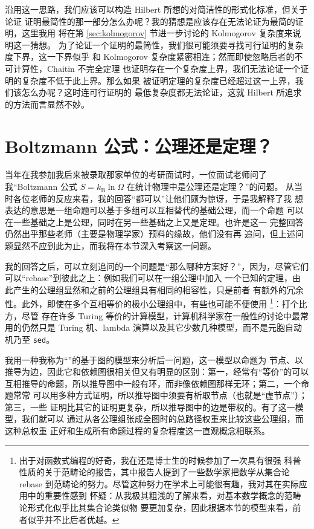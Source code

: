 沿用这一思路，我们应该可以构造 Hilbert 所想的对简洁性的形式化标准，但关于论证
证明最简性的那一部分怎么办呢？我的猜想是应该存在无法论证为最简的证明，这里我用
将在第 \ref{sec:kolmogorov} 节进一步讨论的 Kolmogorov 复杂度来说明这一猜想。
为了论证一个证明的最简性，我们很可能须要寻找可行证明的复杂度下界，这一下界似乎
和 Kolmogorov 复杂度紧密相连；然而即使忽略后者的不可计算性，Chaitin 不完全定理
也证明存在一个复杂度上界，我们无法论证一个证明的复杂度不低于此上界。那么如果
被证明定理的复杂度已经超过这一上界，我们该怎么办呢？这时连可行证明的
最低复杂度都无法论证，这就 Hilbert 所追求的方法而言显然不妙。

\section{Boltzmann 公式：公理还是定理？}\label{sec:boltzmann}

当年在我参加我后来被录取那家单位的考研面试时，一位面试老师问了我“Boltzmann
公式 $S = k_\mathrm{B} \ln\varOmega$ 在统计物理中是公理还是定理？”的问题。
从当时各位老师的反应来看，我的回答“都可以”让他们颇为惊讶，于是我解释了我
想表达的意思是一组命题可以基于多组可以互相替代的基础公理，而一个命题
可以在一些基础之上是公理，同时在另一些基础之上又是定理。也许是这一
完整回答仍然出乎那些老师（主要是物理学家）预料的缘故，他们没有再
追问，但上述问题显然不应到此为止，而我将在本节深入考察这一问题。

我的回答之后，可以立刻追问的一个问题是“那么哪种方案好？”，因为，尽管它们可以“rebase”到彼此之上：例如我们可以在一组公理中加入
一个已知的定理，由此产生的公理组显然和之前的公理组具有相同的相容性，只是前者
有额外的冗余性。此外，即使在多个互相等价的极小公理组中，有些也可能不便使用%
\footnote{出于对函数式编程的好奇，我在还是博士生的时候参加了一次具有很强
科普性质的关于范畴论的报告，其中报告人提到了一些数学家把数学从集合论 rebase
到范畴论的努力。尽管这种努力在学术上可能很有趣，我对其在实际应用中的重要性感到
怀疑：从我极其粗浅的了解来看，对基本数学概念的范畴论形式化似乎比其集合论类似物
要更加复杂，因此根据本节的模型来看，前者似乎并不比后者优越。}：打个比方，尽管
存在许多 Turing 等价的计算模型，计算机科学家在一般性的讨论中最常用的仍然只是
Turing 机、lambda 演算以及其它少数几种模型，而不是元胞自动机乃至 \verb|sed|。

我用一种我称为“”的基于图的模型来分析后一问题，这一模型以命题为
节点、以推导为边，因此它和依赖图很相关但又有明显的区别：第一，经常有“等价”的可以
互相推导的命题，所以推导图中一般有环，而非像依赖图那样无环；第二，一个命题常常
可以用多种方式证明，所以推导图中须要有析取节点（也就是“虚节点”）；第三，一些
证明比其它的证明更复杂，所以推导图中的边是带权的。有了这一模型，我们就可以
通过从各公理组张成全图时的总路径权重来比较这些公理组，而这种总权重
正好和生成所有命题过程的复杂程度这一直观概念相联系。

